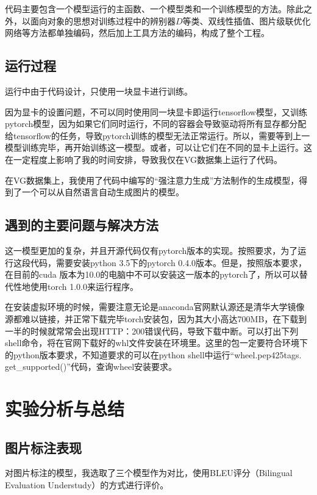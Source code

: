 代码主要包含一个模型运行的主函数、一个模型类和一个训练模型的方法。除此之外，以面向对象的思想对训练过程中的辨别器$D$等类、双线性插值、图片级联优化网络等方法都单独编码，然后加上工具方法的编码，构成了整个工程。

\subsection{运行过程}
运行中由于代码设计，只使用一块显卡进行训练。

因为显卡的设置问题，不可以同时使用同一块显卡即运行tensorflow模型，又训练pytorch模型，因为如果它们同时运行，不同的容器会导致驱动将所有显存都分配给tensorflow的任务，导致pytorch训练的模型无法正常运行。所以，需要等到上一模型训练完毕，再开始训练这一模型。或者，可以让它们在不同的显卡上运行。这在一定程度上影响了我的时间安排，导致我仅在VG数据集上运行了代码。

在VG数据集上，我使用了代码中编写的“强注意力生成”方法制作的生成模型，得到了一个可以从自然语言自动生成图片的模型。

\subsection{遇到的主要问题与解决方法}
这一模型更加的复杂，并且开源代码仅有pytorch版本的实现。按照要求，为了运行这段代码，需要安装python 3.5下的pytorch 0.4.0版本。但是，按照版本要求，在目前的cuda 版本为10.0的电脑中不可以安装这一版本的pytorch了，所以可以替代性地使用torch 1.0.0来运行程序。

在安装虚拟环境的时候，需要注意无论是anaconda官网默认源还是清华大学镜像源都难以链接，并正常下载完毕torch安装包，因为其大小高达700MB，在下载到一半的时候就常常会出现HTTP：200错误代码，导致下载中断。可以打出下列shell命令，将在官网下载好的whl文件安装在环境里。这里的包一定要符合环境下的python版本要求，不知道要求的可以在python shell中运行“wheel.pep425tags. get\_supported()”代码，查询wheel安装要求。





\section{实验分析与总结}
\subsection{图片标注表现}
对图片标注的模型，我选取了三个模型作为对比，使用BLEU评分（Bilingual Evaluation Understudy）的方式进行评价。

